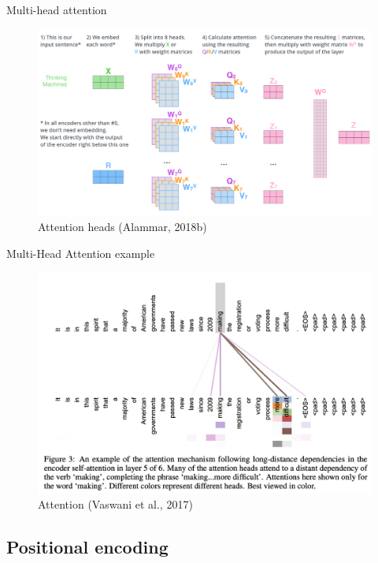 \documentclass[10pt]{beamer}
\begin{document}
\begin{frame}{Multi-head attention}

\begin{figure}[h]
\centering
\includegraphics[width=1\textwidth]{fig/alammar_transformer_multi-headed_self-attention-recap.png}
\caption{Attention heads (Alammar, 2018b)}
\end{figure}

\end{frame}


\begin{frame}{Multi-Head Attention example}

\begin{figure}[h]
\centering
\includegraphics[width=1\textwidth]{fig/Vaswani_3_attention.png}
\caption{Attention (Vaswani et al., 2017)}
\end{figure}

\end{frame}

\subsection{Positional encoding}
\end{document}
